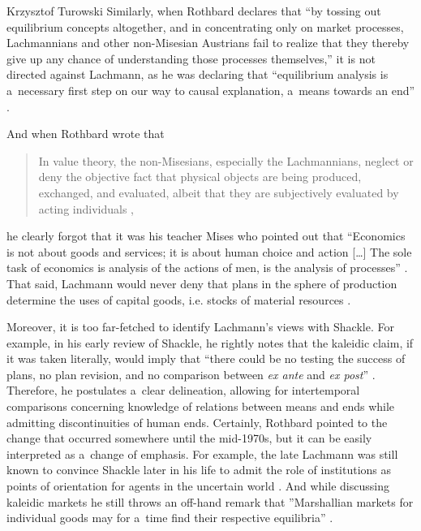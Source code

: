\begin{artengenv}{Krzysztof Turowski}
Similarly, when Rothbard \parencite*[57]{rothbard-present} declares that ``by tossing out equilibrium concepts altogether, and in concentrating only on market processes, Lachmannians and other non-Misesian Austrians fail to realize that they thereby give up any chance of understanding those processes themselves,'' it is not directed against Lachmann, as he was declaring that ``equilibrium analysis is a~necessary first step on our way to causal explanation, a~means towards an end'' \parencite[198]{lachmann-hayek}.

And when Rothbard wrote that
\begin{quote}
In value theory, the non-Misesians, especially the Lachmannians, neglect or deny the objective fact that physical objects are being produced, exchanged, and evaluated, albeit that they are subjectively evaluated by acting individuals \parencite[50]{rothbard-present},
\end{quote}
he clearly forgot that it was his teacher Mises who pointed out that ``Economics is not about goods and services; it is about human choice and action [\ldots] The sole task of economics is analysis of the actions of men, is the analysis of processes'' \parencite[354]{mises-ha}.
That said, Lachmann would never deny that plans in the sphere of production determine the uses of capital goods, i.e. stocks of material resources \parencite[for example in][10--11]{lachmann1956capital}.

Moreover, it is too far-fetched to identify Lachmann's views with Shackle. For example, in his early review of Shackle, he rightly notes that the kaleidic claim, if it was taken literally, would imply that ``there could be no testing the success of plans, no plan revision, and no comparison between \emph{ex ante} and \emph{ex post}'' \parencite[84]{lachmann-shackle-time}. Therefore, he postulates a~clear delineation, allowing for intertemporal comparisons concerning knowledge of relations between means and ends while admitting discontinuities of human ends.
Certainly, Rothbard pointed to the change that occurred somewhere until the mid-1970s, but it can be easily interpreted as a~change of emphasis.
For example, the late Lachmann was still known to convince Shackle later in his life to admit the role of institutions as points of orientation for agents in the uncertain world \parencite[in][31]{dekker-lachmann}.
And while discussing kaleidic markets he still throws an off-hand remark that ''Marshallian markets for individual goods may for a~time find their respective equilibria'' \parencite[61]{lachmann-kaleidic}.


\end{artengenv}
